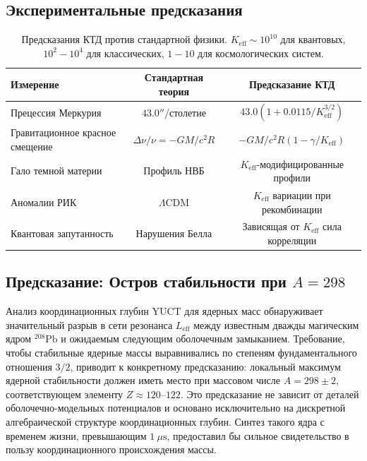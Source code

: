 \documentclass[11pt,a4paper]{article}
\begin{document}
	\subsection{Экспериментальные предсказания}
	
	\begin{table}[htbp]
		\centering
		\begin{tabular}{lcc}
			\toprule
			\textbf{Измерение} & \textbf{Стандартная теория} & \textbf{Предсказание КТД} \\
			\midrule
			Прецессия Меркурия & $43.0''$/столетие & $43.0(1 + 0.0115/K_{\mathrm{eff}}^{3/2})$ \\
			Гравитационное красное смещение & $\Delta\nu/\nu = -GM/c^2R$ & $-GM/c^2R(1 - \gamma/K_{\mathrm{eff}})$ \\
			Гало темной материи & Профиль НВБ & $K_{\mathrm{eff}}$-модифицированные профили \\
			Аномалии РИК & $\Lambda$CDM & $K_{\mathrm{eff}}$ вариации при рекомбинации \\
			Квантовая запутанность & Нарушения Белла & Зависящая от $K_{\mathrm{eff}}$ сила корреляции \\
			\bottomrule
		\end{tabular}
		\caption{Предсказания КТД против стандартной физики. $K_{\mathrm{eff}} \sim 10^{10}$ для квантовых, $10^2-10^4$ для классических, $1-10$ для космологических систем.}
	\end{table}
	
	\subsection{Предсказание: Остров стабильности при $A=298$}
	
	Анализ координационных глубин YUCT для ядерных масс обнаруживает значительный разрыв в сети резонанса $L_{\mathrm{eff}}$ между известным дважды магическим ядром $^{208}\mathrm{Pb}$ и ожидаемым следующим оболочечным замыканием. Требование, чтобы стабильные ядерные массы выравнивались по степеням фундаментального отношения $3/2$, приводит к конкретному предсказанию: локальный максимум ядерной стабильности должен иметь место при массовом числе $A = 298 \pm 2$, соответствующем элементу $Z \approx 120$--$122$. Это предсказание не зависит от деталей оболочечно-модельных потенциалов и основано исключительно на дискретной алгебраической структуре координационных глубин. Синтез такого ядра с временем жизни, превышающим $1\ \mu\text{s}$, предоставил бы сильное свидетельство в пользу координационного происхождения массы.
	
\end{document}

